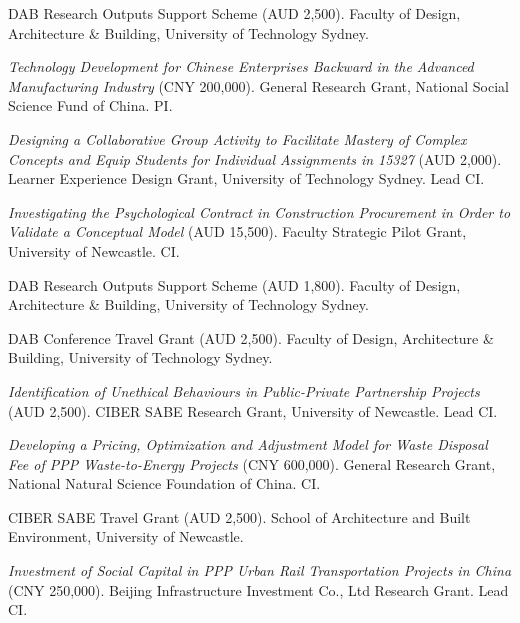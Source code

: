 \documentclass[11pt,a4paper]{report} %
\begin{document}
\begin{tablist}
        \item[2019] \tab{}DAB Research Outputs Support Scheme (AUD 2,500). Faculty of Design, Architecture \& Building, University of Technology Sydney.
        
        \item[2018--21] \tab{}\textit{Technology Development for Chinese Enterprises Backward in the Advanced Manufacturing Industry} (CNY 200,000). General Research Grant, National Social Science Fund of China. PI.
        
        \item[2017] \tab{}\textit{Designing a Collaborative Group Activity to Facilitate Mastery of Complex Concepts and Equip Students for Individual Assignments in 15327} (AUD 2,000). Learner Experience Design Grant, University of Technology Sydney. Lead CI.
        
        \item[2017] \tab{}\textit{Investigating the Psychological Contract in Construction Procurement in Order to Validate a Conceptual Model} (AUD 15,500). Faculty Strategic Pilot Grant, University of Newcastle. CI.
        
        \item[2017] \tab{}DAB Research Outputs Support Scheme (AUD 1,800). Faculty of Design, Architecture \& Building, University of Technology Sydney.
        
        \item[2016] \tab{}DAB Conference Travel Grant (AUD 2,500). Faculty of Design, Architecture \& Building, University of Technology Sydney.
        
        \item[2015] \tab{}\textit{Identification of Unethical Behaviours in Public-Private Partnership Projects} (AUD 2,500). CIBER SABE Research Grant, University of Newcastle. Lead CI.
        
        \item[2015--18] \tab{}\textit{Developing a Pricing, Optimization and Adjustment Model for Waste Disposal Fee of PPP Waste-to-Energy Projects} (CNY 600,000). General Research Grant, National Natural Science Foundation of China. CI.
        
        \item[2015] \tab{}CIBER SABE Travel Grant (AUD 2,500). School of Architecture and Built Environment, University of Newcastle.
        
        \item[2014--15] \tab{}\textit{Investment of Social Capital in PPP Urban Rail Transportation Projects in China} (CNY 250,000). Beijing Infrastructure Investment Co., Ltd Research Grant. Lead CI.
        

\end{tablist}
\end{document}
